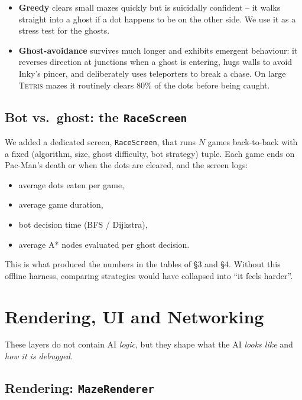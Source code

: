 \documentclass[11pt,a4paper]{article}
\begin{document}
\begin{itemize}[leftmargin=1.3em,itemsep=1pt]
  \item \textbf{Greedy} clears small mazes quickly but is suicidally
        confident -- it walks straight into a ghost if a dot happens to
        be on the other side. We use it as a stress test for the ghosts.
  \item \textbf{Ghost-avoidance} survives much longer and exhibits
        emergent behaviour: it reverses direction at junctions when a
        ghost is entering, hugs walls to avoid Inky's pincer, and
        deliberately uses teleporters to break a chase. On large
        \textsc{Tetris} mazes it routinely clears 80\% of the dots
        before being caught.
\end{itemize}

\subsection{Bot vs.\ ghost: the \texttt{RaceScreen}}

We added a dedicated screen, \texttt{RaceScreen}, that runs $N$ games
back-to-back with a fixed (algorithm, size, ghost difficulty, bot
strategy) tuple. Each game ends on Pac-Man's death or when the dots
are cleared, and the screen logs:
\begin{itemize}[leftmargin=1.3em,itemsep=1pt]
  \item average dots eaten per game,
  \item average game duration,
  \item bot decision time (BFS / Dijkstra),
  \item average A* nodes evaluated per ghost decision.
\end{itemize}
This is what produced the numbers in the tables of \S3 and \S4. Without
this offline harness, comparing strategies would have collapsed into
``it feels harder''.

\section{Rendering, UI and Networking}

These layers do not contain AI \emph{logic}, but they shape what the AI
\emph{looks like} and \emph{how it is debugged}.

\subsection{Rendering: \texttt{MazeRenderer}}
\end{document}
